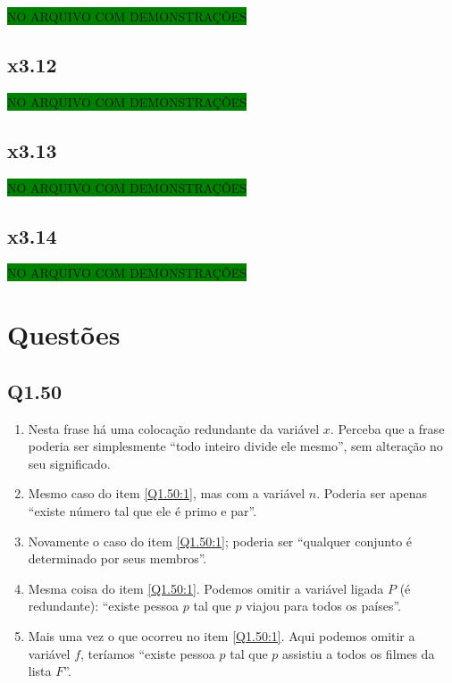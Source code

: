 \documentclass[portuguese,a4paper,12pt]{article}
\begin{document}
	\colorbox{green}{NO ARQUIVO COM DEMONSTRAÇÕES}
	
	\subsection*{x3.12}
	
	\colorbox{green}{NO ARQUIVO COM DEMONSTRAÇÕES}
	
	\subsection*{x3.13}
	
	\colorbox{green}{NO ARQUIVO COM DEMONSTRAÇÕES}
	
	\subsection*{x3.14}
	
	\colorbox{green}{NO ARQUIVO COM DEMONSTRAÇÕES}
	
	\section*{\centering Questões}
	
	\subsection*{Q1.50}
	
	\begin{enumerate}[label=(\arabic*)]
		\item \label{Q1.50:1} Nesta frase há uma colocação redundante da variável $x$. Perceba que a frase poderia ser simplesmente ``todo inteiro divide ele mesmo'', sem alteração no seu significado.
		\item Mesmo caso do item \ref{Q1.50:1}, mas com a variável $n$. Poderia ser apenas ``existe número tal que ele é primo e par''.
		\item Novamente o caso do item \ref{Q1.50:1}; poderia ser ``qualquer conjunto é determinado por seus membros''.
		\item Mesma coisa do item \ref{Q1.50:1}. Podemos omitir a variável ligada $P$ (é redundante): ``existe pessoa $p$ tal que $p$ viajou para todos os países''.
		\item Mais uma vez o que ocorreu no item \ref{Q1.50:1}. Aqui podemos omitir a variável $f$, teríamos ``existe pessoa $p$ tal que $p$ assistiu a todos os filmes da lista $F$''.
	\end{enumerate}
	
\end{document}
